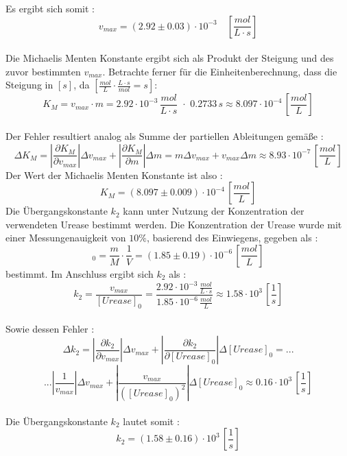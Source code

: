 Es ergibt sich somit : 
\begin{equation}
v_{max} = (2.92 \pm 0.03 )\cdot 10^{-3}  \quad \left[\si{\frac{mol}{L\cdot s}}\right]
\end{equation}\\
Die Michaelis Menten Konstante ergibt sich als Produkt der Steigung und des zuvor bestimmten $v_{max}$. Betrachte ferner für die Einheitenberechnung, dass die Steigung in $  [\si{s}]$, da $ [\si{\frac{mol}{L}\cdot \frac{L\cdot s}{mol} = s}]$: 
\begin{equation}
K_M = v_{max} \cdot m = 2.92 \cdot 10^{-3} \, \si{\frac{mol}{L\cdot s}}\,\, \cdot \,\,0.2733  \,\si{s} \approx 8.097 \cdot 10^{-4} \, \left[\si{\frac{mol}{L}}\right]
\end{equation}\\
Der Fehler resultiert analog als Summe der partiellen Ableitungen gemäße : 
\begin{equation}
\Delta K_M = |\frac{\partial K_M}{\partial v_{max}}|\Delta v_{max} + |\frac{\partial K_M}{\partial m}|\Delta m  = m \Delta v_{max} + v_{max}\Delta m \approx 8.93 \cdot 10^{-7} \,\left[\si{\frac{mol}{L}}\right]
\end{equation}
Der Wert der Michaelis Menten Konstante ist also : 
\begin{equation}
K_M = (8.097 \pm 0.009) \cdot 10^{-4} \,\left[\si{\frac{mol}{L}}\right]
\end{equation}
Die Übergangskonstante $k_2$ kann unter Nutzung der Konzentration der verwendeten Urease bestimmt werden. Die Konzentration der Urease wurde mit einer Messungenauigkeit von $10\%$, basierend des  Einwiegens, gegeben als :
\begin{equation}
[Urease]_0 = \frac{m}{M}\cdot \frac{1}{V} =  (1.85 \pm 0.19)\cdot 10^{-6} \,\left[\si{\frac{mol}{L}}\right]
\end{equation} 
bestimmt. Im Anschluss ergibt sich $k_2$ als : 
\begin{equation}
k_2 = \frac{v_{max}}{[Urease]_0} = \frac{2.92\cdot 10^{-3}\, \si{\frac{mol}{L\cdot s}}}{1.85 \cdot 10^{-6} \, \si{\frac{mol}{L}}} \approx 1.58 \cdot 10^3 \, \left[\si{\frac{1}{s}}\right]
\label{eq:k2}
\end{equation}
\\
Sowie dessen Fehler : 
\begin{equation}
\Delta k_2 = \left|\frac{\partial k_2}{\partial v_{max}}\right|\Delta v_{max} + \left|\frac{\partial k_2}{\partial [Urease]_0}\right|\Delta [Urease]_0  = ...
\end{equation}
\begin{equation*}
... \left|\frac{1}{v_{max}}\right| \Delta v_{max} + \left|\frac{v_{max}}{([Urease]_0)^2}\right|\Delta [Urease]_0 \approx 0.16\cdot 10^{3} \,\left[\si{\frac{1}{s}}\right]
\end{equation*}
\\
Die Übergangskonstante $k_2$ lautet somit : 
\begin{equation}
k_2 = (1.58 \pm 0.16)\cdot 10^{3}\,\left[\si{\frac{1}{s}}\right]
\end{equation}
%